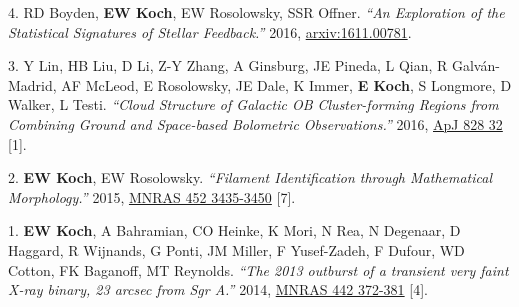 \documentclass[letterpaper,11pt]{article}
\newenvironment{publist}{
  \begingroup
  \raggedright
  \begin{description}[leftmargin=4ex,style=sameline]
}{
  \end{description}
  \endgroup
}
\begin{document}
\begin{publist}
\item[4.] RD Boyden, \textbf{EW Koch}, EW Rosolowsky, SSR Offner. \textit{``An Exploration of the Statistical Signatures of Stellar Feedback.''} 2016, \href{http://adsabs.harvard.edu/abs/2016arXiv161100781B}{arxiv:1611.00781}.
\item[3.] Y Lin, HB Liu, D Li, Z-Y Zhang, A Ginsburg, JE Pineda, L Qian, R Galv\'{a}n-Madrid, AF McLeod, E Rosolowsky, JE Dale, K Immer, \textbf{E Koch}, S Longmore, D Walker, L Testi. \textit{``Cloud Structure of Galactic OB Cluster-forming Regions from Combining Ground and Space-based Bolometric Observations.''} 2016, \href{http://adsabs.harvard.edu/abs/2016ApJ...828...32L}{ApJ 828 32} [1].
\item[2.] \textbf{EW Koch}, EW Rosolowsky. \textit{``Filament Identification through Mathematical Morphology.''} 2015, \href{http://adsabs.harvard.edu/abs/2015MNRAS.452.3435K}{MNRAS 452 3435-3450} [7].
\item[1.] \textbf{EW Koch}, A Bahramian, CO Heinke, K Mori, N Rea, N Degenaar, D Haggard, R Wijnands, G Ponti, JM Miller, F Yusef-Zadeh, F Dufour, WD Cotton, FK Baganoff, MT Reynolds. \textit{``The 2013 outburst of a transient very faint X-ray binary, 23 arcsec from Sgr A\textasteriskcentered.''} 2014, \href{http://adsabs.harvard.edu/abs/2014MNRAS.442..372K}{MNRAS 442 372-381} [4].
\end{publist}


\end{document}
